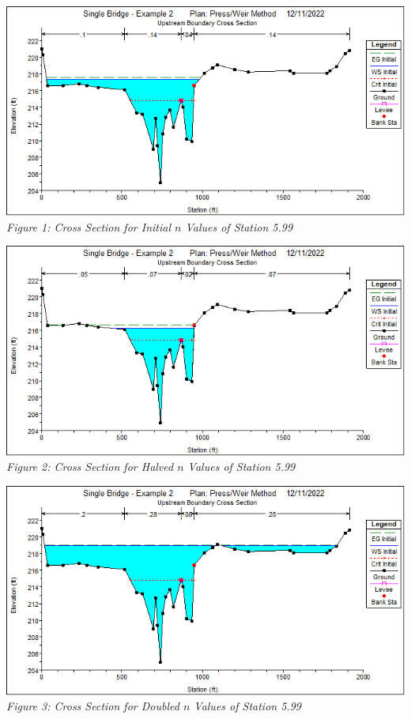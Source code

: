 \begin{center}
\newpage\begin{center}
    \includegraphics[scale=0.7, frame]{fig1.png}
    \\\emph{Figure 1: Cross Section for Initial $n$ Values of Station 5.99}\\
    \vspace{5mm}
    \includegraphics[scale=0.7, frame]{fig2.png}
    \\\emph{Figure 2: Cross Section for Halved $n$ Values of Station 5.99}\\
    \vspace{5mm}
    \includegraphics[scale=0.7, frame]{fig3.png}
    \\\emph{Figure 3: Cross Section for Doubled $n$ Values of Station 5.99}\\
\end{center}\newpage

\end{center}
